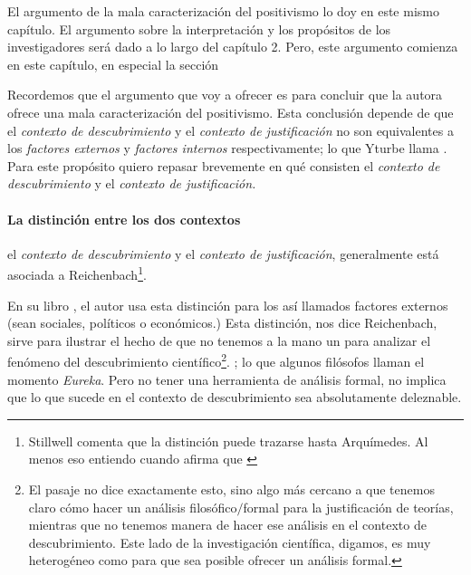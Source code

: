 El argumento de la mala caracterización del positivismo lo doy en este mismo capítulo.
El argumento sobre la interpretación y los propósitos de los investigadores será dado a lo largo del capítulo 2.
Pero, este argumento comienza en este capítulo, en especial la sección 

Recordemos que el argumento que voy a ofrecer es para concluir que la autora ofrece una mala caracterización del positivismo.
Esta conclusión depende de que el \emph{contexto de descubrimiento} y el \emph{contexto de justificación} no son equivalentes a los \emph{factores externos} y \emph{factores internos} respectivamente; lo que Yturbe llama .
Para este propósito quiero repasar brevemente en qué consisten el \emph{contexto de descubrimiento} y el \emph{contexto de justificación.}


\paragraph{La distinción entre los dos contextos} el \emph{contexto de descubrimiento} y el \emph{contexto de justificación}, generalmente está asociada a Reichenbach\footnote{
	Stillwell comenta que la distinción puede trazarse hasta Arquímedes.
Al menos eso entiendo cuando afirma que  \parencite[p. 56]{stillwell1989mathematics}}.

En su libro , el autor usa esta distinción para  los así llamados factores externos (sean sociales, políticos o económicos.) 
Esta distinción, nos dice Reichenbach, sirve para ilustrar el hecho de que no tenemos a la mano un  para analizar el fenómeno del descubrimiento científico\footnote{
	El pasaje no dice exactamente esto, sino algo más cercano a que tenemos claro cómo hacer un análisis filosófico$/$formal para la justificación de teorías, mientras que no tenemos manera de hacer ese análisis en el contexto de descubrimiento.
	Este lado de la investigación científica, digamos, es muy heterogéneo como para que sea posible ofrecer un análisis formal.
	}.
; lo que algunos filósofos \parencite{reichenbach1938experience, Seo2015} llaman el momento \emph{Eureka}.
Pero no tener una herramienta de análisis formal, no implica que lo que sucede en el contexto de descubrimiento sea absolutamente deleznable.

